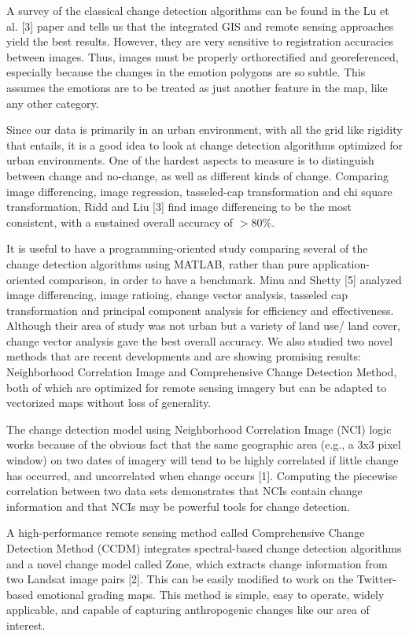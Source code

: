\documentclass[conference]{IEEEtran}
\begin{document}
A survey of the classical change detection algorithms can be found in the Lu et al. [3] paper and tells us that the integrated GIS and remote sensing approaches yield the best results. However, they are very sensitive to registration accuracies between images. Thus, images must be properly orthorectified and georeferenced, especially because the changes in the emotion polygons are so subtle. This assumes the emotions are to be treated as just another feature in the map, like any other category.

Since our data is primarily in an urban environment, with all the grid like rigidity that entails, it is a good idea to look at change detection algorithms optimized for urban environments. One of the hardest aspects to measure is to distinguish between change and no-change, as well as different kinds of change. Comparing image differencing, image regression, tasseled-cap transformation and chi square transformation, Ridd and Liu [3] find image differencing to be the most consistent, with a sustained overall accuracy of 
$>$80\%.

It is useful to have a programming-oriented study comparing several of the change detection algorithms using MATLAB, rather than pure application-oriented comparison, in order to have a benchmark. Minu and Shetty [5] analyzed image differencing, image ratioing, change vector analysis, tasseled cap transformation and principal component analysis for efficiency and effectiveness. Although their area of study was not urban but a variety of land use/ land cover, change vector analysis gave the best overall accuracy.
We also studied two novel methods that are recent developments and are showing promising results: Neighborhood Correlation Image and Comprehensive Change Detection Method, both of which are optimized for remote sensing imagery but can be adapted to vectorized maps without loss of generality.

The change detection model using Neighborhood Correlation Image (NCI) logic works because of the obvious fact that the same geographic area (e.g., a 3x3 pixel window) on two dates of imagery will tend to be highly correlated if little change has occurred, and uncorrelated when change occurs [1]. Computing the piecewise correlation between two data sets demonstrates that NCIs contain change information and that NCIs may be powerful tools for change detection.

A high-performance remote sensing method called Comprehensive Change Detection Method (CCDM) integrates spectral-based change detection algorithms and a novel change model called Zone, which extracts change information from two Landsat image pairs [2]. This can be easily modified to work on the Twitter-based emotional grading maps. This method is simple, easy to operate, widely applicable, and capable of capturing anthropogenic changes like our area of interest.
\end{document}
